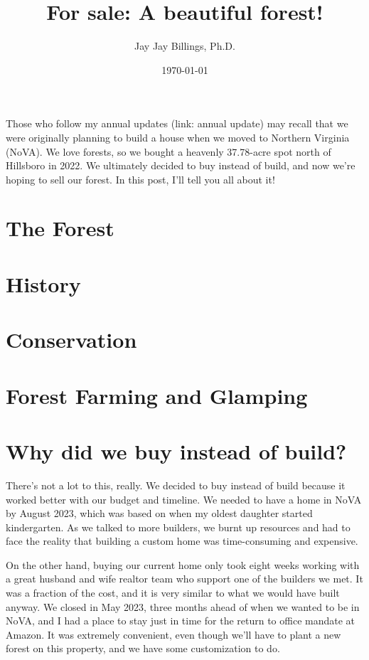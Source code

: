 \documentclass{article}
\title{For sale: A beautiful forest!}
\author{Jay Jay Billings, Ph.D.}
\date{\today}
\begin{document}
\maketitle

Those who follow my annual updates (link: annual update) may recall that we were originally planning to build a house when we moved to Northern Virginia (NoVA). We love forests, so we bought a heavenly 37.78-acre spot north of Hillsboro in 2022. We ultimately decided to buy instead of build, and now we're hoping to sell our forest. In this post, I'll tell you all about it! 

\section*{The Forest}

\section*{History}

\section*{Conservation}

\section*{Forest Farming and Glamping}

\section*{Why did we buy instead of build?}

There's not a lot to this, really. We decided to buy instead of build because it worked better with our budget and timeline. We needed to have a home in NoVA by August 2023, which was based on when my oldest daughter started kindergarten. As we talked to more builders, we burnt up resources and had to face the reality that building a custom home was time-consuming and expensive. 

On the other hand, buying our current home only took eight weeks working with a great husband and wife realtor team who support one of the builders we met. It was a fraction of the cost, and it is very similar to what we would have built anyway. We closed in May 2023, three months ahead of when we wanted to be in NoVA, and I had a place to stay just in time for the return to office mandate at Amazon. It was extremely convenient, even though we'll have to plant a new forest on this property, and we have some customization to do. 
\end{document}
